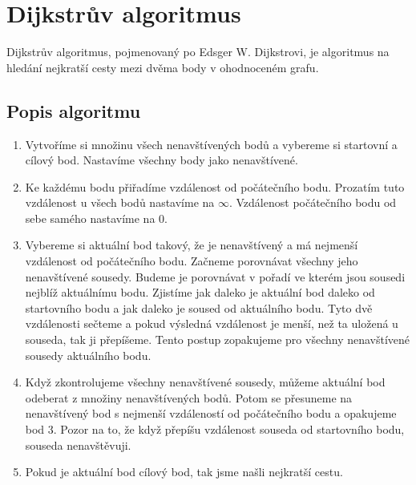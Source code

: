 \section{Dijkstrův algoritmus}
\label{sec:dijkstra}

Dijkstrův algoritmus, pojmenovaný po Edsger W. Dijkstrovi, je algoritmus na hledání nejkratší cesty mezi dvěma body v ohodnoceném grafu. 

\subsection{Popis algoritmu}
\label{subsec:popis-algoritmu}

\begin{enumerate}
    \item Vytvoříme si množinu všech nenavštívených bodů a vybereme si startovní a cílový bod. Nastavíme všechny body jako nenavštívené. 
    \item Ke každému bodu přiřadíme vzdálenost od počátečního bodu. Prozatím tuto vzdálenost u všech bodů nastavíme na $\infty$. Vzdálenost počátečního bodu od sebe samého nastavíme na $0$.
    \item Vybereme si aktuální bod takový, že je nenavštívený a má nejmenší vzdálenost od počátečního bodu. Začneme porovnávat všechny jeho nenavštívené sousedy. Budeme je porovnávat v pořadí ve kterém jsou sousedi nejblíž aktuálnímu bodu. Zjistíme jak daleko je aktuální bod daleko od startovního bodu a jak daleko je soused od aktuálního bodu. Tyto dvě vzdálenosti sečteme a pokud výsledná vzdálenost je menší, než ta uložená u souseda, tak ji přepíšeme. Tento postup zopakujeme pro všechny nenavštívené sousedy aktuálního bodu.
    \item Když zkontrolujeme všechny nenavštívené sousedy, můžeme aktuální bod odeberat z množiny nenavštívených bodů. Potom se přesuneme na nenavštívený bod s nejmenší vzdáleností od počátečního bodu a opakujeme bod 3. Pozor na to, že když přepíšu vzdálenost souseda od startovního bodu, souseda nenavštěvuji.
    \item Pokud je aktuální bod cílový bod, tak jsme našli nejkratší cestu.
\end{enumerate}
